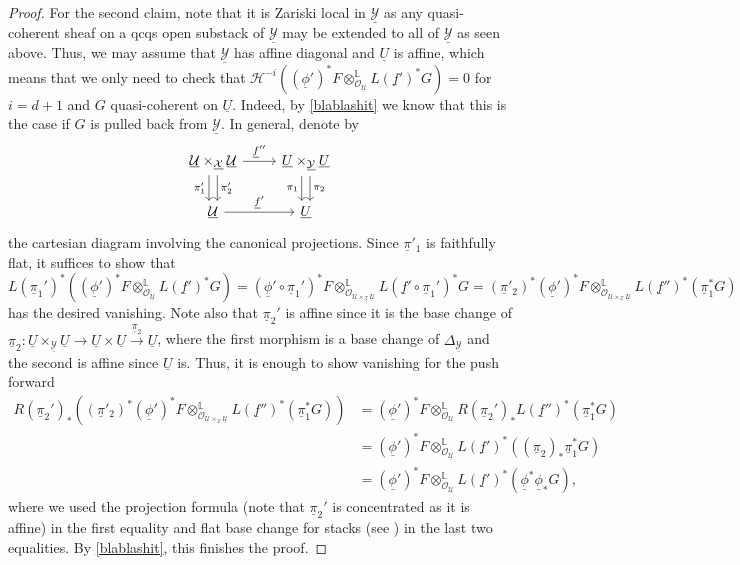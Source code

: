 \documentclass[11pt]{amsart}
\theoremstyle{definition}
\theoremstyle{definition}
\newcommand{\cY}{\mathcal{Y}}
\newcommand{\ul}[1]{\underline{#1}}
\newcommand{\cal}{\mathcal}
\def\cY{{\cal Y}}
\begin{document}
\begin{proof}
    For the second claim, note that it is Zariski local in $\ul{\mathcal{Y}}$ as any quasi-coherent sheaf on a qcqs open substack of $\ul{\mathcal{Y}}$ may be extended to all of $\ul{\mathcal{Y}}$ as seen above. Thus, we may assume that $\ul{\cY}$ has affine diagonal and $\ul{U}$ is affine, which means that we only need to check that $\mathcal{H}^{-i}((\ul{\phi}')^*F\otimes_{\mathcal{O}_{\ul{\mathcal{U}}}}^\mathbb{L} L(\ul{f}')^*G)=0$ for $i=d+1$ and $G$ quasi-coherent on $\ul{U}$. Indeed, by \eqref{blablashit} we know that this is the case if $G$ is pulled back from $\ul{\mathcal{Y}}$. In general, denote by 
    \[
    \begin{tikzcd}
        \ul{\mathcal{U}}\times_{\ul{\mathcal{X}}} \ul{\mathcal{U}}\dar[xshift=0.7ex,"\pi_2'"] \dar[xshift=-0.7ex,"\pi_1'"'] \rar["\ul{f}''"] &\ul{U}\times_{\ul{\mathcal{Y}}} \ul{U}\dar[xshift=0.7ex,"\pi_2"] \dar[xshift=-0.7ex,"\pi_1"']\\
        \ul{\mathcal{U}} \rar["\ul{f}'"] &\ul{U}
    \end{tikzcd}
    \]
    the cartesian diagram involving the canonical projections. Since $\ul{\pi}'_1$ is faithfully flat, it suffices to show that
    $$
        L(\ul{\pi}_1')^*((\ul{\phi}')^*F\otimes_{\mathcal{O}_{\ul{\mathcal{U}}}}^\mathbb{L} L(\ul{f}')^*G) = (\ul{\phi}'\circ \ul{\pi}_1')^*F \otimes^\mathbb{L}_{\mathcal{O}_{\ul{\mathcal{U}}\times_{\ul{\mathcal{X}}} \ul{\mathcal{U}}}}L(\ul{f}'\circ\ul{\pi}_1')^*G = (\ul{\pi}'_2)^*(\ul{\phi}')^*F \otimes^\mathbb{L}_{\mathcal{O}_{\ul{\mathcal{U}}\times_{\ul{\mathcal{X}}} \ul{\mathcal{U}}}}L(\ul{f}'')^*(\ul{\pi}_1^*G)
    $$
    has the desired vanishing. Note also that $\ul{\pi}_2'$ is affine since it is the base change of $\ul{\pi}_2\colon \ul{U}\times_{\ul{\mathcal{Y}}}\ul{U}\rightarrow \ul{U}\times \ul{U}\xrightarrow{\ul{\pi}_2} \ul{U}$, where the first morphism is a base change of $\Delta_{\ul{\mathcal{Y}}}$ and the second is affine since $\ul{U}$ is. Thus, it is enough to show vanishing for the push forward
    \begin{align*}
         R(\ul{\pi}_2')_* \left((\ul{\pi}'_2)^*(\ul{\phi}')^*F \otimes^\mathbb{L}_{\mathcal{O}_{\ul{\mathcal{U}}\times_{\ul{\mathcal{X}}} \ul{\mathcal{U}}}}L(\ul{f}'')^*(\ul{\pi}_1^*G)\right)
        &= (\ul{\phi}')^*F\otimes^\mathbb{L}_{\mathcal{O}_{\ul{\mathcal{U}}}}R(\ul{\pi}_2')_*L(\ul{f}'')^*(\ul{\pi}_1^*G)\\
        &= (\ul{\phi}')^*F\otimes^\mathbb{L}_{\mathcal{O}_{\ul{\mathcal{U}}}}L(\ul{f}')^*((\ul{\pi}_2)_*\ul{\pi}_1^*G)\\
        &= (\ul{\phi}')^*F\otimes^\mathbb{L}_{\mathcal{O}_{\ul{\mathcal{U}}}}L(\ul{f}')^*(\ul{\phi}^*\ul{\phi}_*G),
    \end{align*}
    where we used the projection formula \cite[Corollary 4.12]{HallRydh2017} (note that $\ul{\pi}_2'$ is concentrated as it is affine) in the first equality and flat base change for stacks (see \cite[Lemma 1.2(4)]{HallRydh2017}) in the last two equalities. By \eqref{blablashit}, this finishes the proof.
\end{proof}
\end{document}
